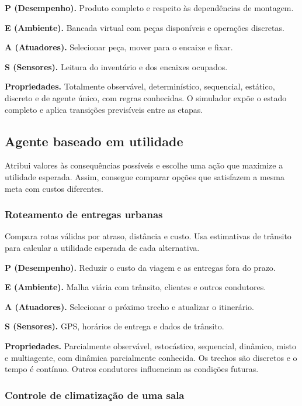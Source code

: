 \documentclass[12pt,a4paper]{article}
\begin{document}
\textbf{P (Desempenho).} Produto completo e respeito às dependências de montagem.

\textbf{E (Ambiente).} Bancada virtual com peças disponíveis e operações discretas.

\textbf{A (Atuadores).} Selecionar peça, mover para o encaixe e fixar.

\textbf{S (Sensores).} Leitura do inventário e dos encaixes ocupados.

\textbf{Propriedades.} Totalmente observável, determinístico, sequencial, estático, discreto e de agente único, com regras conhecidas. O simulador expõe o estado completo e aplica transições previsíveis entre as etapas.

\subsection{Agente baseado em utilidade}

Atribui valores às consequências possíveis e escolhe uma ação que maximize a utilidade esperada. Assim, consegue comparar opções que satisfazem a mesma meta com custos diferentes.

\subsubsection{Roteamento de entregas urbanas}

Compara rotas válidas por atraso, distância e custo. Usa estimativas de trânsito para calcular a utilidade esperada de cada alternativa.

\textbf{P (Desempenho).} Reduzir o custo da viagem e as entregas fora do prazo.

\textbf{E (Ambiente).} Malha viária com trânsito, clientes e outros condutores.

\textbf{A (Atuadores).} Selecionar o próximo trecho e atualizar o itinerário.

\textbf{S (Sensores).} GPS, horários de entrega e dados de trânsito.

\textbf{Propriedades.} Parcialmente observável, estocástico, sequencial, dinâmico, misto e multiagente, com dinâmica parcialmente conhecida. Os trechos são discretos e o tempo é contínuo. Outros condutores influenciam as condições futuras.

\subsubsection{Controle de climatização de uma sala}
\end{document}
